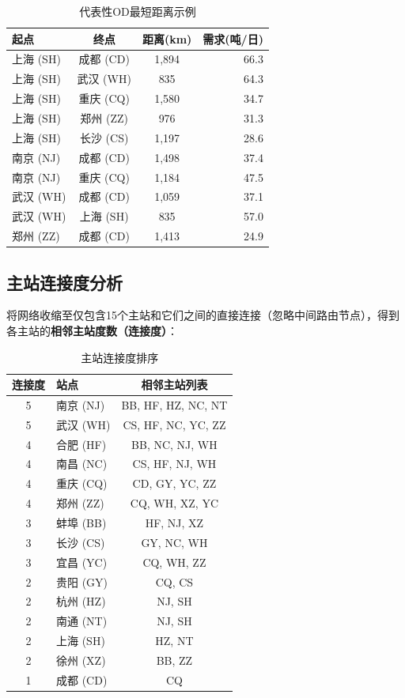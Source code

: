 \documentclass[12pt,a4paper,fontset=none]{ctexart}
\begin{document}
\begin{table}[H]
\centering
\caption{代表性OD最短距离示例}
\label{tab:od_dist_sample}
\begin{tabular}{lccr}
\toprule
\textbf{起点} & \textbf{终点} & \textbf{距离(km)} & \textbf{需求(吨/日)} \\
\midrule
上海 (SH) & 成都 (CD) & 1,894 & 66.3 \\
上海 (SH) & 武汉 (WH) & 835  & 64.3 \\
上海 (SH) & 重庆 (CQ) & 1,580 & 34.7 \\
上海 (SH) & 郑州 (ZZ) & 976  & 31.3 \\
上海 (SH) & 长沙 (CS) & 1,197 & 28.6 \\
南京 (NJ) & 成都 (CD) & 1,498 & 37.4 \\
南京 (NJ) & 重庆 (CQ) & 1,184 & 47.5 \\
武汉 (WH) & 成都 (CD) & 1,059 & 37.1 \\
武汉 (WH) & 上海 (SH) & 835  & 57.0 \\
郑州 (ZZ) & 成都 (CD) & 1,413 & 24.9 \\
\bottomrule
\end{tabular}
\end{table}

\subsection{主站连接度分析}

将网络收缩至仅包含15个主站和它们之间的直接连接（忽略中间路由节点），得到各主站的\textbf{相邻主站度数（连接度）}：

\begin{table}[H]
\centering
\caption{主站连接度排序}
\begin{tabular}{clc}
\toprule
\textbf{连接度} & \textbf{站点} & \textbf{相邻主站列表} \\
\midrule
5 & 南京 (NJ) & BB, HF, HZ, NC, NT \\
5 & 武汉 (WH) & CS, HF, NC, YC, ZZ \\
4 & 合肥 (HF) & BB, NC, NJ, WH \\
4 & 南昌 (NC) & CS, HF, NJ, WH \\
4 & 重庆 (CQ) & CD, GY, YC, ZZ \\
4 & 郑州 (ZZ) & CQ, WH, XZ, YC \\
3 & 蚌埠 (BB) & HF, NJ, XZ \\
3 & 长沙 (CS) & GY, NC, WH \\
3 & 宜昌 (YC) & CQ, WH, ZZ \\
2 & 贵阳 (GY) & CQ, CS \\
2 & 杭州 (HZ) & NJ, SH \\
2 & 南通 (NT) & NJ, SH \\
2 & 上海 (SH) & HZ, NT \\
2 & 徐州 (XZ) & BB, ZZ \\
1 & 成都 (CD) & CQ \\
\bottomrule
\end{tabular}
\end{table}
\end{document}
